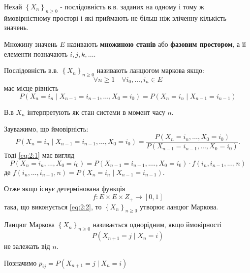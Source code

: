 
Нехай $\left\{ X_n \right\}_{n\geq 0}$ - послідовність в.в. заданих на одному
і тому ж ймовірністному просторі і які приймають не більш ніж зліченну кількість значень.

Множину значень $E$ називають \textbf{множиною станів} або \textbf{фазовим простором}, а її
елементи позначають $i, j, k, \ldots$.

\begin{definition}
  Послідовність в.в. $\left\{ X_n \right\}_{n \geq 0}$ називають ланцюгом маркова якщо:
  \[
  \forall n \geq 1 \quad \forall i_0, \ldots, i_n \in E
  \] 
має місце рівність
\begin{equation} \label{eq:2:1} \tag{2.1}
  P\left( X_{n} = i_{n} \mid X_{n-1} = i_{n-1}, \ldots, X_0 = i_0 \right) =
  P\left( X_n = i_n \mid X_{n-1} = i_{n-1} \right) 
\end{equation}
\end{definition}

В.в $X_n$ інтерпретують як стан системи в момент часу $n$.

Зауважимо, що ймовірність:
\[
P\left( X_n = i_n  \mid X_{n-1}=i_{n-1}, \ldots, X_0=i_0 \right) =
\frac{P\left( X_n=i_n,\ldots,X_0=i_0 \right)}{P\left( X_{n-1}=i_{n-1}, \ldots, X_0 = i_0 \right) }
.\] 
Тоді \ref{eq:2:1} має вигляд
\begin{equation} \label{eq:2:2} \tag{2.2}
P\left( X_n = i_n,\ldots,X_0=i_0 \right) = P\left( X_{n-1}=i_{n-1}, \ldots.,
    X_0 = i_0 \right) \cdot f\left( i_n, i_{n-1}, \ldots, n \right)
\end{equation}
де $f\left( i_n, \ldots, i_{n-1}, n \right) = P\left( X_n = i_n  \mid X_{n-1} = i_{n-1} \right)$.

Отже якщо існує детермінована функція
\[
  f : E \times E \times Z_{+} \to [0,1]
\] така, що виконується \ref{eq:2:2}, то $\left\{ X_{n} \right\} _{n \geq 0}$ утворює ланцюг Маркова.


\begin{definition}
  Ланцюг Маркова $\left\{ X_n \right\}_{n \geq 0}$ називається однорідним, якщо ймовірності
  \[
  P\left( X_{n+1} = j \mid X_{n} = i \right)
  \] не залежать від $n$.
\end{definition}

\begin{remark}
 Позначимо $p_{ij} = P\left( X_{n+1} = j  \mid X_n = i \right)$
\end{remark}

